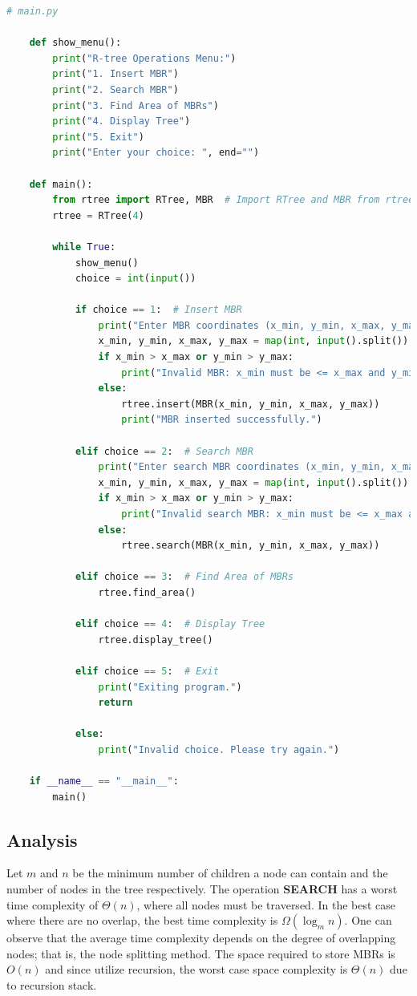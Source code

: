 \documentclass{article}
\begin{document}
\begin{lstlisting}[language=python]
	# main.py

	def show_menu():
		print("R-tree Operations Menu:")
		print("1. Insert MBR")
		print("2. Search MBR")
		print("3. Find Area of MBRs")
		print("4. Display Tree")
		print("5. Exit")
		print("Enter your choice: ", end="")

	def main():
		from rtree import RTree, MBR  # Import RTree and MBR from rtree module
		rtree = RTree(4)
		
		while True:
			show_menu()
			choice = int(input())
			
			if choice == 1:  # Insert MBR
				print("Enter MBR coordinates (x_min, y_min, x_max, y_max): ", end="")
				x_min, y_min, x_max, y_max = map(int, input().split())
				if x_min > x_max or y_min > y_max:
					print("Invalid MBR: x_min must be <= x_max and y_min must be <= y_max")
				else:
					rtree.insert(MBR(x_min, y_min, x_max, y_max))
					print("MBR inserted successfully.")
			
			elif choice == 2:  # Search MBR
				print("Enter search MBR coordinates (x_min, y_min, x_max, y_max): ", end="")
				x_min, y_min, x_max, y_max = map(int, input().split())
				if x_min > x_max or y_min > y_max:
					print("Invalid search MBR: x_min must be <= x_max and y_min must be <= y_max")
				else:
					rtree.search(MBR(x_min, y_min, x_max, y_max))
			
			elif choice == 3:  # Find Area of MBRs
				rtree.find_area()
			
			elif choice == 4:  # Display Tree
				rtree.display_tree()
			
			elif choice == 5:  # Exit
				print("Exiting program.")
				return
			
			else:
				print("Invalid choice. Please try again.")

	if __name__ == "__main__":
		main()
\end{lstlisting}

\subsection{Analysis}
Let $m$ and $n$ be the minimum number of children a node can contain and the number of nodes in the tree respectively. The operation \textbf{SEARCH} has a worst time complexity of $\Theta(n)$, where all nodes must be traversed. In the best case where there are no overlap, the best time complexity is $\Omega(\log_m n)$. One can observe that the average time complexity depends on the degree of overlapping nodes; that is, the node splitting method. The space required to store MBRs is $O(n)$ and since utilize recursion, the worst case space complexity is $\Theta(n)$ due to recursion stack.
\end{document}
